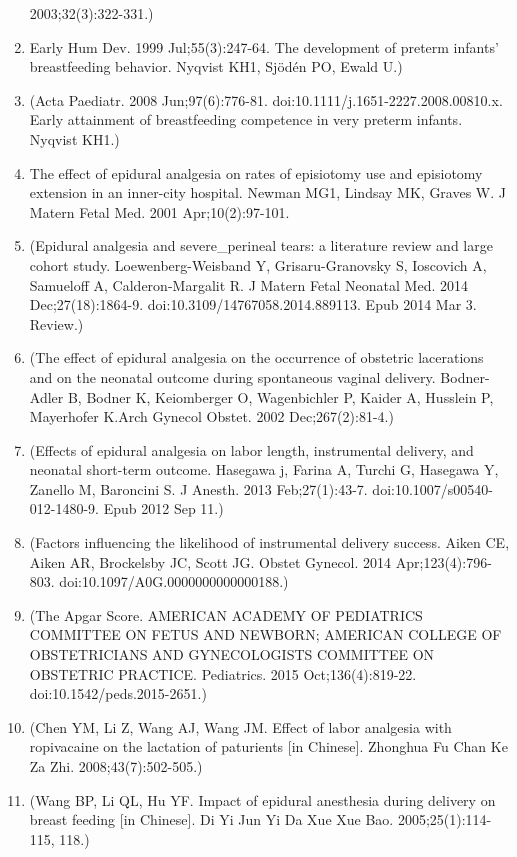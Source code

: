 \documentclass[]{article}
\begin{document}
\begin{enumerate}
  2003;32(3):322-331.)
\item
  Early Hum Dev. 1999 Jul;55(3):247-64. The development of preterm
  infants' breastfeeding behavior. Nyqvist KH1, Sjödén PO, Ewald U.)
\item
  (Acta Paediatr. 2008 Jun;97(6):776-81.
  doi:10.1111/j.1651-2227.2008.00810.x. Early attainment of
  breastfeeding competence in very preterm infants. Nyqvist KH1.)
\item
  The effect of epidural analgesia on rates of episiotomy use and
  episiotomy extension in an inner-city hospital. Newman MG1, Lindsay
  MK, Graves W. J Matern Fetal Med. 2001 Apr;10(2):97-101.
\item
  (Epidural analgesia and severe\_perineal tears: a literature review
  and large cohort study. Loewenberg-Weisband Y, Grisaru-Granovsky S,
  Ioscovich A, Samueloff A, Calderon-Margalit R. J Matern Fetal Neonatal
  Med. 2014 Dec;27(18):1864-9. doi:10.3109/14767058.2014.889113. Epub
  2014 Mar 3. Review.)
\item
  (The effect of epidural analgesia on the occurrence of obstetric
  lacerations and on the neonatal outcome during spontaneous vaginal
  delivery. Bodner-Adler B, Bodner K, Keiomberger O, Wagenbichler P,
  Kaider A, Husslein P, Mayerhofer K.Arch Gynecol Obstet. 2002
  Dec;267(2):81-4.)
\item
  (Effects of epidural analgesia on labor length, instrumental delivery,
  and neonatal short-term outcome. Hasegawa j, Farina A, Turchi G,
  Hasegawa Y, Zanello M, Baroncini S. J Anesth. 2013 Feb;27(1):43-7.
  doi:10.1007/s00540-012-1480-9. Epub 2012 Sep 11.)
\item
  (Factors influencing the likelihood of instrumental delivery success.
  Aiken CE, Aiken AR, Brockelsby JC, Scott JG. Obstet Gynecol. 2014
  Apr;123(4):796-803. doi:10.1097/A0G.0000000000000188.)
\item
  (The Apgar Score. AMERICAN ACADEMY OF PEDIATRICS COMMITTEE ON FETUS
  AND NEWBORN; AMERICAN COLLEGE OF OBSTETRICIANS AND GYNECOLOGISTS
  COMMITTEE ON OBSTETRIC PRACTICE. Pediatrics. 2015 Oct;136(4):819-22.
  doi:10.1542/peds.2015-2651.)
\item
  (Chen YM, Li Z, Wang AJ, Wang JM. Effect of labor analgesia with
  ropivacaine on the lactation of paturients {[}in Chinese{]}. Zhonghua
  Fu Chan Ke Za Zhi. 2008;43(7):502-505.)
\item
  (Wang BP, Li QL, Hu YF. Impact of epidural anesthesia during delivery
  on breast feeding {[}in Chinese{]}. Di Yi Jun Yi Da Xue Xue Bao.
  2005;25(1):114-115, 118.)

\end{enumerate}
\end{document}
